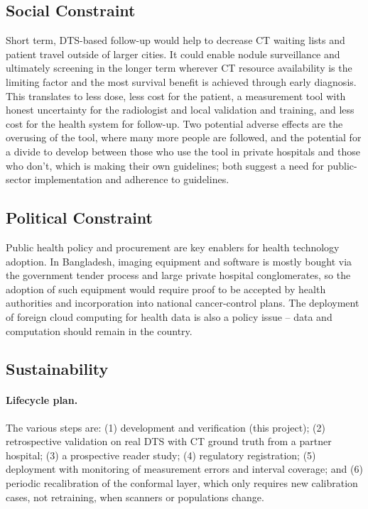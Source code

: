 \subsection{Social Constraint}

Short term, DTS-based follow-up would help to decrease CT waiting lists and patient travel outside of larger cities. It could enable nodule surveillance and ultimately screening in the longer term wherever CT resource availability is the limiting factor and the most survival benefit is achieved through early diagnosis. This translates to less dose, less cost for the patient, a measurement tool with honest uncertainty for the radiologist and local validation and training, and less cost for the health system for follow-up. Two potential adverse effects are the overusing of the tool, where many more people are followed, and the potential for a divide to develop between those who use the tool in private hospitals and those who don't, which is making their own guidelines; both suggest a need for public-sector implementation and adherence to guidelines.

\subsection{Political Constraint}

Public health policy and procurement are key enablers for health technology adoption. In Bangladesh, imaging equipment and software is mostly bought via the government tender process and large private hospital conglomerates, so the adoption of such equipment would require proof to be accepted by health authorities and incorporation into national cancer-control plans. The deployment of foreign cloud computing for health data is also a policy issue -- data and computation should remain in the country.

\subsection{Sustainability}

\paragraph{Lifecycle plan.} The various steps are: (1) development and verification (this project); (2) retrospective validation on real DTS with CT ground truth from a partner hospital; (3) a prospective reader study; (4) regulatory registration; (5) deployment with monitoring of measurement errors and interval coverage; and (6) periodic recalibration of the conformal layer, which only requires new calibration cases, not retraining, when scanners or populations change.

